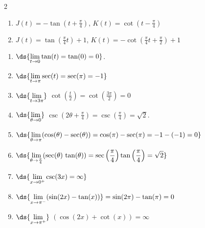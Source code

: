 \documentclass{ximera}
\begin{document}
\begin{multicols}{2}
\begin{enumerate}
\setcounter{enumi}{\value{HW}}

\item  $J(t) = -\tan\left(t+ \frac{\pi}{4} \right)$, $K(t) = \cot  \left(t - \frac{\pi}{4} \right)$

\item  $J(t) = \tan\left( \frac{\pi}{4} t \right) + 1$, $K(t) = -\cot\left( \frac{\pi}{4} t + \frac{\pi}{2} \right) + 1$

\setcounter{HW}{\value{enumi}}
\end{enumerate}
\end{multicols}




\begin{enumerate}
\setcounter{enumi}{\value{HW}}

\item $\ds{\lim_{t \rightarrow 0} \tan(t) = \tan(0) = 0}$.

\item $\ds{\lim_{t \rightarrow \pi} \sec(t) = \sec(\pi) = -1}$

\item $\ds{\lim_{t \rightarrow 3\pi}}$ $\cot\left(\frac{t}{2}\right) = \cot\left(\frac{3\pi}{2}\right) = 0$

\item  $\ds{\lim_{\theta \rightarrow 0}}$ $\csc\left(2\theta + \frac{\pi}{4}\right) = \csc\left(\frac{\pi}{4}\right) = \sqrt{2}$.

\item $\ds{\lim_{\theta \rightarrow \pi} (\cos(\theta)  -  \sec(\theta)) = \cos(\pi) - \sec(\pi) = -1 - (-1) = 0}$

\item $\ds{\lim_{\theta \rightarrow \frac{\pi}{4}} (\sec(\theta) \, \tan(\theta)) = \sec\left( \frac{\pi}{4} \right) \tan\left( \frac{\pi}{4} \right) = \sqrt{2}}$

\item  $\ds{\lim_{x \rightarrow 0^{+}} \csc(3x) = \infty}$

\item $\ds{\lim_{x \rightarrow \pi^{-}}  (\sin(2x)  - \tan(x))}  = \sin(2\pi) - \tan(\pi) = 0$

\item $\ds{\lim_{x \rightarrow \pi^{+}}}$ $(\cos(2x) + \cot(x)) =  \infty$

\setcounter{HW}{\value{enumi}}
\end{enumerate}
\end{document}
